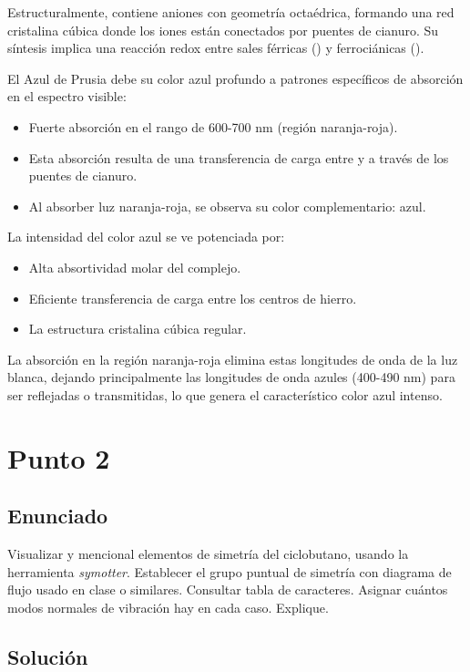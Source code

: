 \documentclass[a4paper,12pt]{article}
\begin{document}
Estructuralmente, contiene aniones  con geometría octaédrica, formando una red cristalina cúbica donde los iones están conectados por puentes de cianuro. Su síntesis implica una reacción redox entre sales férricas () y ferrociánicas ().

El Azul de Prusia debe su color azul profundo a patrones específicos de absorción en el espectro visible:
\begin{itemize}
    \item Fuerte absorción en el rango de 600-700 nm (región naranja-roja).
    \item Esta absorción resulta de una transferencia de carga entre  y  a través de los puentes de cianuro.
    \item Al absorber luz naranja-roja, se observa su color complementario: azul.
\end{itemize}

La intensidad del color azul se ve potenciada por:
\begin{itemize}
    \item Alta absortividad molar del complejo.
    \item Eficiente transferencia de carga entre los centros de hierro.
    \item La estructura cristalina cúbica regular.
\end{itemize}

La absorción en la región naranja-roja elimina estas longitudes de onda de la luz blanca, dejando principalmente las longitudes de onda azules (400-490 nm) para ser reflejadas o transmitidas, lo que genera el característico color azul intenso.

\section{Punto 2}
\subsection*{Enunciado}
Visualizar y mencional elementos de simetría del ciclobutano, usando la herramienta \textit{symotter}. Establecer el grupo puntual de simetría con diagrama de flujo usado en clase o similares. Consultar tabla de caracteres. Asignar cuántos modos normales de vibración hay en cada caso. Explique.
\subsection*{Solución}
\end{document}
